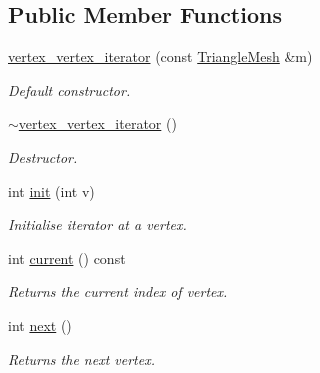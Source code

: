 \subsection*{Public Member Functions}
\begin{DoxyCompactItemize}
\item 
\hyperlink{classgeoproc_1_1iterators_1_1vertex_1_1vertex__vertex__iterator_a6132b060a09bd87279957cc9744cd9af}{vertex\+\_\+vertex\+\_\+iterator} (const \hyperlink{classgeoproc_1_1TriangleMesh}{Triangle\+Mesh} \&m)
\begin{DoxyCompactList}\small\item\em Default constructor. \end{DoxyCompactList}\item 
\mbox{\label{classgeoproc_1_1iterators_1_1vertex_1_1vertex__vertex__iterator_a72bd7a8a23b7418d4a6c55fa9e277d08}} 
\hyperlink{classgeoproc_1_1iterators_1_1vertex_1_1vertex__vertex__iterator_a72bd7a8a23b7418d4a6c55fa9e277d08}{$\sim$vertex\+\_\+vertex\+\_\+iterator} ()
\begin{DoxyCompactList}\small\item\em Destructor. \end{DoxyCompactList}\item 
int \hyperlink{classgeoproc_1_1iterators_1_1vertex_1_1vertex__vertex__iterator_aa25d74c5f4067074ed6926a6d23800b4}{init} (int v)
\begin{DoxyCompactList}\small\item\em Initialise iterator at a vertex. \end{DoxyCompactList}\item 
int \hyperlink{classgeoproc_1_1iterators_1_1vertex_1_1vertex__vertex__iterator_a3e1a4cd5c67b262156017489662ecabc}{current} () const
\begin{DoxyCompactList}\small\item\em Returns the current index of vertex. \end{DoxyCompactList}\item 
int \hyperlink{classgeoproc_1_1iterators_1_1vertex_1_1vertex__vertex__iterator_ad2041720a1d35892804c659de7b2dd44}{next} ()
\begin{DoxyCompactList}\small\item\em Returns the next vertex. \end{DoxyCompactList}\end{DoxyCompactItemize}
